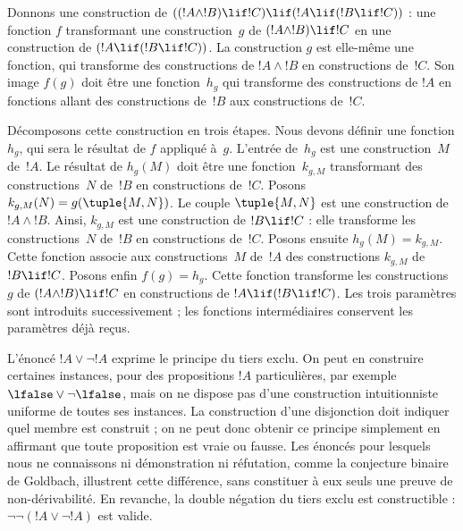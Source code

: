 \documentclass[../../../include/open-logic-section]{subfiles}
\begin{document}
\begin{ex}
Donnons une construction de $((!A \land !B) \lif !C) \lif (!A \lif
(!B \lif !C))$ : une fonction $f$ transformant une construction~$g$
de $(!A \land !B) \lif !C$ en une construction de
$(!A \lif (!B \lif !C))$. La construction $g$ est elle-même
une fonction, qui transforme des constructions de $!A \land !B$
en constructions de~$!C$. Son image $f(g)$ doit être une
fonction~$h_g$ qui transforme des constructions de $!A$ en
fonctions allant des constructions de~$!B$ aux constructions de~$!C$.

Décomposons cette construction en trois étapes. Nous devons définir
une fonction $h_g$, qui sera le résultat de $f$ appliqué à~$g$.
L'entrée de~$h_g$ est une construction~$M$ de~$!A$.
Le résultat de $h_g(M)$ doit être une fonction~$k_{g,M}$
transformant des constructions~$N$ de~$!B$ en constructions
de~$!C$. Posons $k_{g,M}(N) = g(\tuple{M, N})$.
Le couple $\tuple{M, N}$ est une construction de~$!A \land !B$.
Ainsi, $k_{g,M}$ est une construction de $!B \lif !C$ : elle
transforme les constructions~$N$ de~$!B$ en constructions de~$!C$.
Posons ensuite $h_g(M) = k_{g,M}$. Cette fonction associe aux
constructions~$M$ de~$!A$ des constructions $k_{g,M}$ de
$!B \lif !C$. Posons enfin $f(g) = h_g$. Cette fonction
transforme les constructions $g$ de $(!A \land !B) \lif !C$
en constructions de $!A \lif (!B \lif !C)$.
Les trois paramètres sont introduits successivement ; les fonctions
intermédiaires conservent les paramètres déjà reçus.
\end{ex}

L'énoncé $!A \lor \lnot !A$ exprime le principe du tiers exclu.
On peut en construire certaines instances, pour des propositions
$!A$ particulières, par exemple $\lfalse \lor \lnot \lfalse$,
mais on ne dispose pas d'une construction intuitionniste uniforme
de toutes ses instances. La construction d'une disjonction doit
indiquer quel membre est construit ; on ne peut donc obtenir ce
principe simplement en affirmant que toute proposition est vraie
ou fausse. Les énoncés pour lesquels nous ne connaissons ni
démonstration ni réfutation, comme la conjecture binaire de Goldbach,
illustrent cette différence, sans constituer à eux seuls une preuve
de non-dérivabilité. En revanche, la double négation du tiers exclu
est constructible : $\lnot \lnot (!A \lor \lnot !A)$ est valide.
\end{document}
